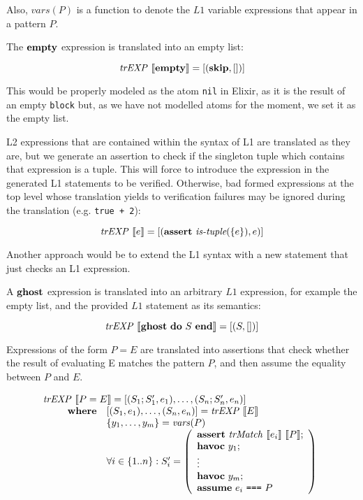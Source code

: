 Also, $\mathit{vars}(P)$ is a function to denote the $L1$ variable expressions
that appear in a pattern $P$.

The $\textbf{empty}$ expression is translated into an empty list:

\[
\mathit{trEXP}~\llbracket\textbf{empty}\rrbracket = [(\textbf{skip}, [])]
\]

This would be properly modeled as the atom \verb|nil| in Elixir, as it is the
result of an empty \verb|block| but, as we have not modelled atoms for the
moment, we set it as the empty list.

L2 expressions that are contained within the syntax of L1 are translated as they
are, but we generate an assertion to check if the singleton tuple which contains
that expression is a tuple. This will force to introduce the expression in the
generated L1 statements to be verified. Otherwise, bad formed expressions at the
top level whose translation yields to verification failures may be ignored
during the translation (e.g. \verb|true + 2|):

\[
\mathit{trEXP}~\llbracket e\rrbracket = [(\textbf{assert}~\textit{is\mbox{-}tuple}(\{e\}), e)]
\]

Another approach would be to extend the L1 syntax with a new statement that just
checks an L1 expression.

A $\textbf{ghost}$ expression is translated into an arbitrary $L1$ expression, for
example the empty list, and the provided $L1$ statement as its semantics:

\[
\mathit{trEXP}~\llbracket\textbf{ghost}~\textbf{do}~S~\textbf{end}\rrbracket = [(S, [])]
\]

Expressions of the form $P = E$ are translated into assertions that check
whether the result of evaluating E matches the pattern $P$, and then assume the
equality between $P$ and $E$.

\[
\begin{array}{l}
\mathit{trEXP}~\llbracket P = E\rrbracket = [(S_1;S_1',e_1), \dots, (S_n;S_n', e_n)] \\
\qquad 
\begin{array}{ll}
\textbf{where} & [(S_1,e_1),\dots,(S_n, e_n)] = \mathit{trEXP}~\llbracket E\rrbracket \\
& \{y_1, \ldots, y_m\} = \mathit{vars}(P) \\
& \forall i \in \{1..n\}: S_i' = \left(
\begin{array}{l}
\textbf{assert}~\mathit{trMatch}~\llbracket e_i\rrbracket~\llbracket P\rrbracket;\\
\textbf{havoc}~y_1;\\
\vdots\\
\textbf{havoc}~y_m;\\
\textbf{assume}~e_i ~\texttt{===}~ P\\
\end{array}
\right)
\end{array}
\end{array}
\]

